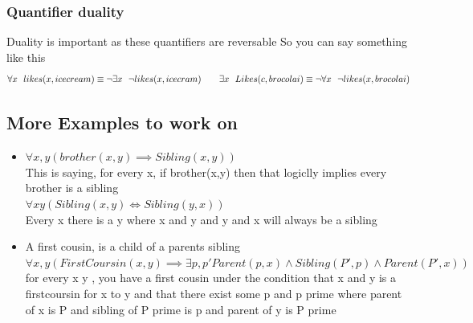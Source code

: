 \documentclass{article}
\theoremstyle{mytheoremstyle}
\theoremstyle{mytheoremstyle}
\theoremstyle{myproblemstyle}
\begin{document}
\newpage
\subsubsection{Quantifier duality}
Duality is important as these quantifiers are reversable
So you can say something like this
\[
	\forall x \ \ likes(x, icecream) \equiv \neg \exists x \ \ \neg likes(x, icecram)\\
	\\
	\\
	\qquad
	\exists x \ \ Likes(c, brocolai) \equiv \neg \forall x \ \ \neg likes(x, brocolai) \]

\subsection{More Examples to work on }
\begin{itemize}
	\item \begin{math}
		      \forall x ,y(brother(x,y) \implies Sibling(x,y))
	      \end{math}
	      \\
	      This is saying, for every x, if brother(x,y) then that logiclly implies every brother is a sibling
	      \\
	      \begin{math}
		      \forall x y(Sibling(x,y) \iff Sibling(y,x))
	      \end{math}
	      \\
	      Every x there is a y where x and y and y and x will always be a sibling
	\item A first cousin, is a child of a parents sibling
	      \\
	      \begin{math}
		      \forall x, y(FirstCoursin(x,y) \implies \exists p, p' Parent(p,x) \land Sibling(P', p) \land Parent(P',x))
	      \end{math}
	      \\
	      for every x y , you have a first cousin under the condition that x and y is a firstcoursin for x to y and that there exist some p and p prime where parent of x is P and sibling of P prime is p and parent of y is P prime
\end{itemize}
\end{document}
